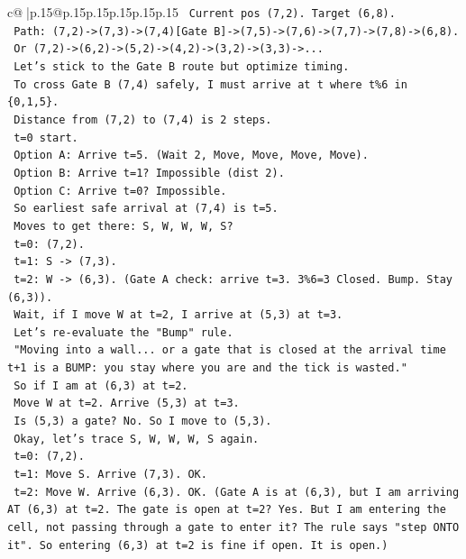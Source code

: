\documentclass{article}
\begin{document}
{\begin{supertabular}{c@{$\;$}|p{.15\linewidth}@{}p{.15\linewidth}p{.15\linewidth}p{.15\linewidth}p{.15\linewidth}p{.15\linewidth}}
{{{\texttt{    Current pos (7,2). Target (6,8).} \\
\texttt{    Path: (7,2){-}>(7,3){-}>(7,4){[}Gate B{]}{-}>(7,5){-}>(7,6){-}>(7,7){-}>(7,8){-}>(6,8).} \\
\texttt{    Or (7,2){-}>(6,2){-}>(5,2){-}>(4,2){-}>(3,2){-}>(3,3){-}>...} \\
\texttt{    Let's stick to the Gate B route but optimize timing.} \\
\texttt{    To cross Gate B (7,4) safely, I must arrive at t where t\%6 in \{0,1,5\}.} \\
\texttt{    Distance from (7,2) to (7,4) is 2 steps.} \\
\texttt{    t=0 start.} \\
\texttt{    Option A: Arrive t=5. (Wait 2, Move, Move, Move, Move).} \\
\texttt{    Option B: Arrive t=1? Impossible (dist 2).} \\
\texttt{    Option C: Arrive t=0? Impossible.} \\
\texttt{    So earliest safe arrival at (7,4) is t=5.} \\
\texttt{    Moves to get there: S, W, W, W, S?} \\
\texttt{    t=0: (7,2).} \\
\texttt{    t=1: S {-}> (7,3).} \\
\texttt{    t=2: W {-}> (6,3). (Gate A check: arrive t=3. 3\%6=3 Closed. Bump. Stay (6,3)).} \\
\texttt{    Wait, if I move W at t=2, I arrive at (5,3) at t=3.} \\
\texttt{    Let's re{-}evaluate the "Bump" rule.} \\
\texttt{    "Moving into a wall... or a gate that is closed at the arrival time t+1 is a BUMP: you stay where you are and the tick is wasted."} \\
\texttt{    So if I am at (6,3) at t=2.} \\
\texttt{    Move W at t=2. Arrive (5,3) at t=3.} \\
\texttt{    Is (5,3) a gate? No. So I move to (5,3).} \\
\texttt{    Okay, let's trace S, W, W, W, S again.} \\
\texttt{    t=0: (7,2).} \\
\texttt{    t=1: Move S. Arrive (7,3). OK.} \\
\texttt{    t=2: Move W. Arrive (6,3). OK. (Gate A is at (6,3), but I am arriving AT (6,3) at t=2. The gate is open at t=2? Yes. But I am entering the cell, not passing through a gate to enter it? The rule says "step ONTO it". So entering (6,3) at t=2 is fine if open. It is open.)} \\
}}}
\end{supertabular}}
\end{document}
